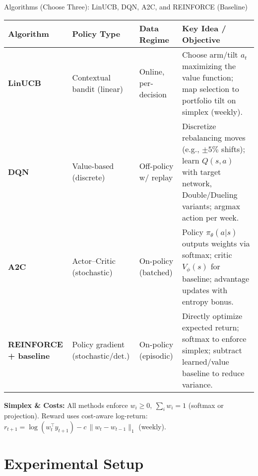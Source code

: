 \documentclass[aspectratio=169]{beamer}
\begin{document}
\begin{frame}{Algorithms (Choose Three): LinUCB, DQN, A2C, and REINFORCE (Baseline)}
\footnotesize
\begin{tabular}{p{1.8cm}p{2.2cm}p{1.8cm}p{7.5cm}}
\toprule
\textbf{Algorithm} & \textbf{Policy Type} & \textbf{Data Regime} & \textbf{Key Idea / Objective} \\
\midrule
\textbf{LinUCB} \citep{li2010linucb} & Contextual bandit (linear) & Online, per-decision & Choose arm/tilt $a_t$ maximizing the value function; map selection to portfolio tilt on simplex (weekly). \\
\textbf{DQN} \citep{lucarelli2020dqncrypto, mnih2015dqn,vanhasselt2016ddqn,wang2016dueling} & Value-based (discrete) & Off-policy w/ replay & Discretize rebalancing moves (e.g., $\pm 5\%$ shifts); learn $Q(s,a)$ with target network, Double/Dueling variants; argmax action per week. \\
\textbf{A2C} \citep{yang2020ensemble, mnih2016a3c} & Actor--Critic (stochastic) & On-policy (batched) & Policy $\pi_\theta(a|s)$ outputs weights via softmax; critic $V_\phi(s)$ for baseline; advantage updates with entropy bonus. \\
\textbf{REINFORCE + baseline} \citep{jiang2017cryptocurrency, williams1992reinforce} & Policy gradient (stochastic/det.) & On-policy (episodic) & Directly optimize expected return; softmax to enforce simplex; subtract learned/value baseline to reduce variance. \\
\bottomrule
\end{tabular}

\vspace{0.6em}
\textbf{Simplex \& Costs:} All methods enforce $w_i\!\ge\!0,~\sum_i w_i\!=\!1$ (softmax or projection). Reward uses cost-aware log-return: $r_{t+1}=\log(w_t^\top y_{t+1})-c\,\|w_t-w_{t-1}\|_1$ (weekly).
\end{frame}



\section{Experimental Setup}
\end{document}
